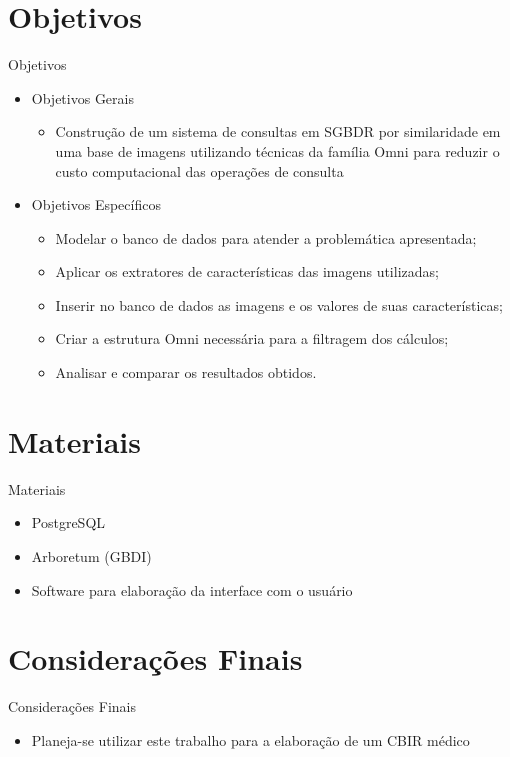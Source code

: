 \documentclass{beamer}
\begin{document}
\section{Objetivos}

\begin{frame}{Objetivos}
  \begin{itemize}
   \item Objetivos Gerais
   \begin{itemize}
      \item Construção de um sistema de consultas em SGBDR por similaridade em uma base de imagens utilizando técnicas da família Omni para reduzir o custo computacional das operações de consulta\newline
   \end{itemize}
   \item Objetivos Específicos
   \begin{itemize}
      \item Modelar o banco de dados para atender a problemática apresentada;
      \item Aplicar os extratores de características das imagens utilizadas;
      \item Inserir no banco de dados as imagens e os valores de suas características;
      \item Criar a estrutura Omni necessária para a filtragem dos cálculos;
      \item Analisar e comparar os resultados obtidos.
   \end{itemize}
   
  \end{itemize}

\end{frame}

\section{Materiais}

\begin{frame}{Materiais}
  \begin{itemize}
   \item PostgreSQL\newline
   \item Arboretum (GBDI)\newline
   \item Software para elaboração da interface com o usuário   
  \end{itemize}

\end{frame}

\section{Considerações Finais}

\begin{frame}{Considerações Finais}
  \begin{itemize}
   \item Planeja-se utilizar este trabalho para a elaboração de um CBIR médico\newline
  \end{itemize}
\end{frame}
\end{document}
